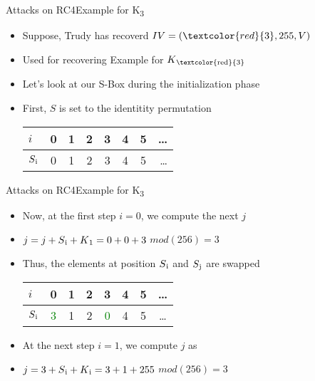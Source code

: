 \documentclass[
	aspectratio=169,	%
	onlytextwidth,		%
	t,					%
	]{beamer}
\begin{document}
\begin{frame}[fragile]{Attacks on RC4}{Example for K\textsubscript{3}}
	\begin{itemize}
		\item Suppose, Trudy has recoverd $IV = (\textcolor{red}{3}, 255, V)$ 
		\item Used for recovering Example for $K\textsubscript{\textcolor{red}{3}}$
		\item Let's look at our S-Box during the initialization phase
		\item First, $S$ is set to the identitity permutation
		\medskip
		\begin{table}[h!]
			\begin{center}
			  \begin{tabular}{l|c|c|c|c|c|c|r}
				$i$ & 0 & 1 & 2 & 3 & 4 & 5 & \dots\\
				\hline
				$S\textsubscript{i}$ & 0 & 1 & 2 & 3 & 4 & 5 & \dots\\
			  \end{tabular}
			\end{center}
		  \end{table}

	\end{itemize}
\end{frame}

\begin{frame}[fragile]{Attacks on RC4}{Example for K\textsubscript{3}}
	\begin{itemize}
		\item Now, at the first step $i=0$, we compute the next $j$
		\item $j = j + S\textsubscript{i} + K\textsubscript{1} = 0 + 0 + 3$ $mod(256) = 3$
		\item Thus, the elements at position $S\textsubscript{i}$ and $S\textsubscript{j}$ are swapped
		\medskip
		\begin{table}[h!]
			\begin{center}
			  \begin{tabular}{l|c|c|c|c|c|c|c}
				$i$ & 0 & 1 & 2 & 3 & 4 & 5 & \dots\\
				\hline
				$S\textsubscript{i}$ & \textcolor{green}{3} & 1 & 2 & \textcolor{green}{0} & 4 & 5 & \dots\\
			  \end{tabular}
			\end{center}
		  \end{table}
		\item At the next step $i = 1$, we compute $j$ as
		\item $j = 3 + S\textsubscript{i} + K\textsubscript{i} = 3 + 1 + 255$ $mod(256) = 3$
	\end{itemize}
\end{frame}
\end{document}
